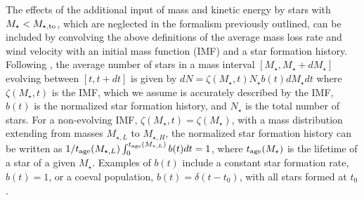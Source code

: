\documentclass[fleqn,usenatbib]{mnras}
\begin{document}
The effects of the additional input of mass and kinetic energy  by stars with $M_\star < M_{\star,{\rm to}}$, which are neglected in the formalism previously outlined, can be included by convolving  the above definitions of the average mass loss rate and wind velocity  with an initial mass function (IMF) and a star formation history.
 Following \cite{kroupa2013}, the average number of stars in a mass interval $[M_\star,M_\star+dM_\star]$ evolving between 
 $[t,t+dt]$ is given by  $dN = \zeta(M_\star,t) N_{\star} b(t) dM_\star dt$ where $\zeta(M_\star,t)$ is the IMF, which we assume  is accurately described by the \citet{kroupa2001}  IMF,  
 $b(t)$ is the normalized star formation history, and $N_{\star}$ is the total number of stars. For a non-evolving IMF, $\zeta(M_\star,t) = \zeta(M_\star)$, with a mass distribution extending 
 from masses $M_{\star,L}$ to $M_{\star,H}$, the normalized star formation history can be written as  $1/t_{\rm age}(M_{\star,L})\int_0^{t_{\rm age}(M_{\star,L})} b(t)dt = 1$, where 
$t_{\rm age}(M_{\star})$ is the  lifetime of a star of  a given $M_\star$. Examples of $b(t)$ include a constant star formation rate, $b(t)=1$,  or a coeval population, $b(t)= \delta(t -t_0)$, with all stars formed at $t_0$.
 
\end{document}
